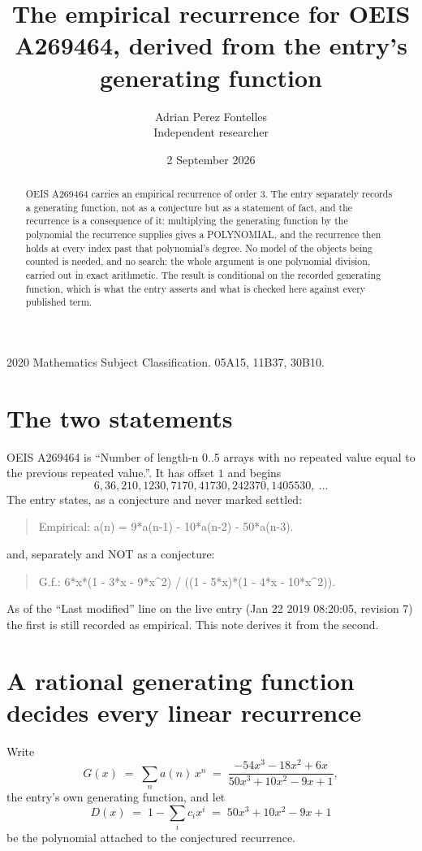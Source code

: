 \documentclass[11pt,a4paper]{article}
\title{The empirical recurrence for OEIS A269464, derived from the entry's generating function}
\author{Adrian Perez Fontelles\\ \small Independent researcher}
\date{2 September 2026}
\theoremstyle{plain}
\theoremstyle{definition}
\begin{document}
\maketitle

\begin{abstract}
OEIS A269464 carries an empirical recurrence of order $3$. The entry separately records a
generating function, not as a conjecture but as a statement of fact, and the recurrence is a
consequence of it: multiplying the generating function by the polynomial the recurrence
supplies gives a POLYNOMIAL, and the recurrence then holds at every index past that
polynomial's degree. No model of the objects being counted is needed, and no search: the
whole argument is one polynomial division, carried out in exact arithmetic. The result is
conditional on the recorded generating function, which is what the entry asserts and what is
checked here against every published term.
\end{abstract}

\noindent\small 2020 Mathematics Subject Classification. 05A15, 11B37, 30B10.\normalsize

\section{The two statements}

OEIS A269464 is ``Number of length-n 0..5 arrays with no repeated value equal to the previous repeated value.''. It has offset $1$ and begins
\[
6, 36, 210, 1230, 7170, 41730, 242370, 1405530,\ \dots
\]
The entry states, as a conjecture and never marked settled:
\begin{quote}
Empirical: a(n) = 9*a(n-1) - 10*a(n-2) - 50*a(n-3).
\end{quote}
and, separately and NOT as a conjecture:
\begin{quote}
G.f.: 6*x*(1 - 3*x - 9*x\^{}2) / ((1 - 5*x)*(1 - 4*x - 10*x\^{}2)).
\end{quote}
As of the ``Last modified'' line on the live entry (Jan 22 2019 08:20:05, revision 7) the first is still
recorded as empirical. This note derives it from the second.

\section{A rational generating function decides every linear recurrence}

Write
\[
G(x)\;=\;\sum_{n}a(n)\,x^{n}\;=\;\frac{- 54 x^{3} - 18 x^{2} + 6 x}{50 x^{3} + 10 x^{2} - 9 x + 1},
\]
the entry's own generating function, and let
\[
D(x)\;=\;1-\sum_i c_i x^{i}\;=\;50 x^{3} + 10 x^{2} - 9 x + 1
\]
be the polynomial attached to the conjectured recurrence.
\end{document}

